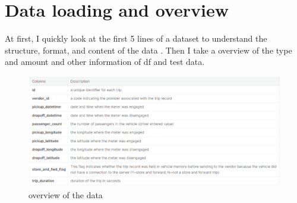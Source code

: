 
%
%
%
%
%



%
%

\section{Data loading and overview} \label{sec-Data loading and overview}

At first, I quickly look at the first 5 lines of a dataset to understand the structure,
format, and content of the data . Then I take a overview of the type and amount
and other information of df and test data.
\begin{figure}[h]
	\centering
	\includegraphics[scale=0.3]{overview.eps}
	\caption{overview of the data}
\end{figure}


